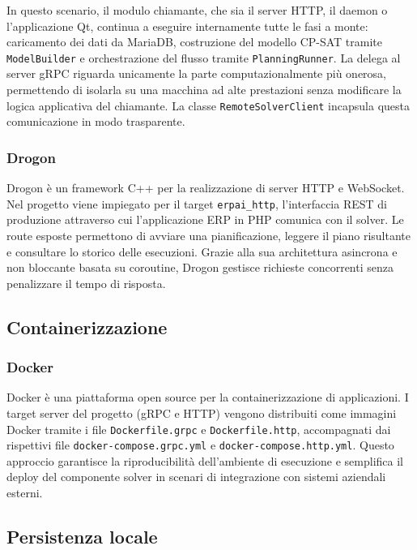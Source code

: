 In questo scenario, il modulo chiamante, che sia il server HTTP, il daemon o l'applicazione Qt, continua a eseguire internamente tutte le fasi a monte: caricamento dei dati da MariaDB, costruzione del modello CP-SAT tramite \texttt{ModelBuilder} e orchestrazione del flusso tramite \texttt{PlanningRunner}. La delega al server gRPC riguarda unicamente la parte computazionalmente più onerosa, permettendo di isolarla su una macchina ad alte prestazioni senza modificare la logica applicativa del chiamante. La classe \texttt{RemoteSolverClient} incapsula questa comunicazione in modo trasparente.

\subsubsection{Drogon}

Drogon è un framework C++ per la realizzazione di server HTTP e WebSocket. Nel progetto viene impiegato per il target \texttt{erpai\_http}, l'interfaccia REST di produzione attraverso cui l'applicazione ERP in PHP comunica con il solver. Le route esposte permettono di avviare una pianificazione, leggere il piano risultante e consultare lo storico delle esecuzioni. Grazie alla sua architettura asincrona e non bloccante basata su coroutine, Drogon gestisce richieste concorrenti senza penalizzare il tempo di risposta.

\subsection{Containerizzazione}
\label{subsec:docker}

\subsubsection{Docker}

Docker è una piattaforma open source per la containerizzazione di applicazioni. I target server del progetto (gRPC e HTTP) vengono distribuiti come immagini Docker tramite i file \texttt{Dockerfile.grpc} e \texttt{Dockerfile.http}, accompagnati dai rispettivi file \texttt{docker-compose.grpc.yml} e \texttt{docker-compose.http.yml}. Questo approccio garantisce la riproducibilità dell'ambiente di esecuzione e semplifica il deploy del componente solver in scenari di integrazione con sistemi aziendali esterni.

\subsection{Persistenza locale}
\label{subsec:sqlite}

